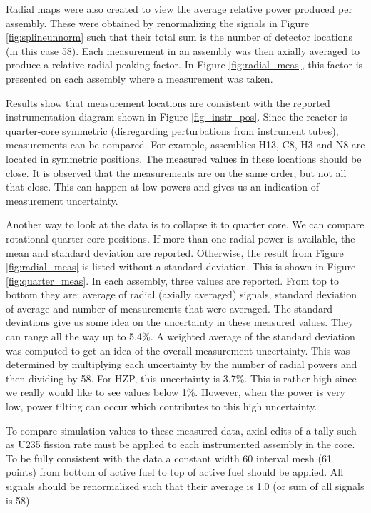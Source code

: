 Radial maps were also created to view the average relative power produced per assembly. 
These were obtained by renormalizing the signals in Figure \ref{fig:splineunnorm} such that their total
sum is the number of detector locations (in this case 58). Each measurement in an assembly was then 
axially averaged to produce a relative radial peaking factor. In Figure \ref{fig:radial_meas}, this factor 
is presented on each assembly where a measurement was taken.

Results show that measurement locations are consistent with the reported instrumentation 
diagram shown in Figure \ref{fig_instr_pos}. Since the reactor is quarter-core symmetric (disregarding perturbations from instrument tubes), 
measurements can be compared. For example, assemblies H13, C8, H3 and N8 are located in 
symmetric positions. The measured values in these locations should be close. It is 
observed that the measurements are on the same order, but not all that close. This can 
happen at low powers and gives us an indication of measurement uncertainty. 

Another way to look at the data is to collapse it to quarter core. 
We can compare rotational quarter core positions. If more than one radial power is available, the mean and standard deviation are reported. Otherwise, the result from Figure \ref{fig:radial_meas} is listed without a standard deviation. This is shown in Figure \ref{fig:quarter_meas}.
In each assembly, three values are reported. From top to bottom they are: 
average of radial (axially averaged) signals, standard deviation of average and 
number of measurements that were averaged. The standard deviations give us some idea 
on the uncertainty in these measured values.  They can range all the way up to 
5.4\%. A weighted average of the standard deviation was computed to get an idea 
of the overall measurement uncertainty. This was determined by multiplying each uncertainty by the number of radial powers and then dividing by 58. For \ac{HZP}, this uncertainty is 3.7\%. This is 
rather high since we really would like to see values below 1\%. However, when the power 
is very low, power tilting can occur which contributes to this high uncertainty.


To compare simulation values to these measured data, axial edits of a tally such as U235 fission
rate must be applied to each instrumented assembly in the core. To be fully
consistent with the data a constant width 60 interval mesh (61 points) from
bottom of active fuel to top of active fuel should be applied. All signals
should be renormalized such that their average is 1.0 (or sum of all signals is
58). 

